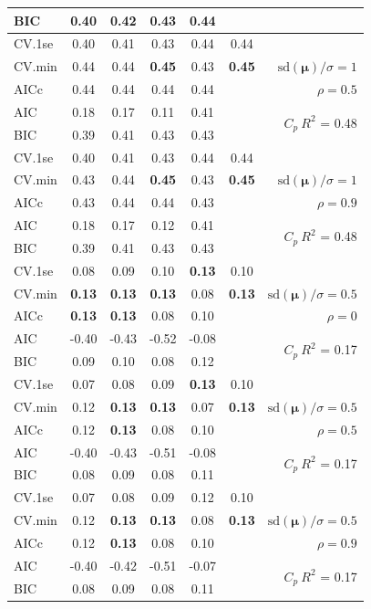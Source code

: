 \documentclass[12pt]{article}
\newcommand{\mr}[1]{\mathrm{#1}}
\newcommand{\bm}[1]{\mathbf{#1}}
\begin{document}
\begin{table}[p]
\begin{center}
\begin{tabular}{l*{5}{c}|r}
BIC & 0.40 & 0.42 & 0.43 & 0.44 & & \\
 \hline 
CV.1se & 0.40 & 0.41 & 0.43 & 0.44 & 0.44 &\\
CV.min & 0.44 & 0.44 & {\bf 0.45} & 0.43 & {\bf 0.45} &  $\mr{sd}(\bm{\mu})/\sigma=1$ \\
AICc & 0.44 & 0.44 & 0.44 & 0.44 & & $\rho=0.5$ \\
AIC & 0.18 & 0.17 & 0.11 & 0.41 & & \multirow{2}{*}{$C_p ~ R^2$ = 0.48} \\
BIC & 0.39 & 0.41 & 0.43 & 0.43 & & \\
 \hline 
CV.1se & 0.40 & 0.41 & 0.43 & 0.44 & 0.44 &\\
CV.min & 0.43 & 0.44 & {\bf 0.45} & 0.43 & {\bf 0.45} &  $\mr{sd}(\bm{\mu})/\sigma=1$ \\
AICc & 0.43 & 0.44 & 0.44 & 0.43 & & $\rho=0.9$ \\
AIC & 0.18 & 0.17 & 0.12 & 0.41 & & \multirow{2}{*}{$C_p ~ R^2$ = 0.48} \\
BIC & 0.39 & 0.41 & 0.43 & 0.43 & & \\
 \hline 
CV.1se & 0.08 & 0.09 & 0.10 & {\bf 0.13} & 0.10 &\\
CV.min & {\bf 0.13} & {\bf 0.13} & {\bf 0.13} & 0.08 & {\bf 0.13} &  $\mr{sd}(\bm{\mu})/\sigma=0.5$ \\
AICc & {\bf 0.13} & {\bf 0.13} & 0.08 & 0.10 & & $\rho=0$ \\
AIC & -0.40 & -0.43 & -0.52 & -0.08 & & \multirow{2}{*}{$C_p ~ R^2$ = 0.17} \\
BIC & 0.09 & 0.10 & 0.08 & 0.12 & & \\
 \hline 
CV.1se & 0.07 & 0.08 & 0.09 & {\bf 0.13} & 0.10 &\\
CV.min & 0.12 & {\bf 0.13} & {\bf 0.13} & 0.07 & {\bf 0.13} &  $\mr{sd}(\bm{\mu})/\sigma=0.5$ \\
AICc & 0.12 & {\bf 0.13} & 0.08 & 0.10 & & $\rho=0.5$ \\
AIC & -0.40 & -0.43 & -0.51 & -0.08 & & \multirow{2}{*}{$C_p ~ R^2$ = 0.17} \\
BIC & 0.08 & 0.09 & 0.08 & 0.11 & & \\
 \hline 
CV.1se & 0.07 & 0.08 & 0.09 & 0.12 & 0.10 &\\
CV.min & 0.12 & {\bf 0.13} & {\bf 0.13} & 0.08 & {\bf 0.13} &  $\mr{sd}(\bm{\mu})/\sigma=0.5$ \\
AICc & 0.12 & {\bf 0.13} & 0.08 & 0.10 & & $\rho=0.9$ \\
AIC & -0.40 & -0.42 & -0.51 & -0.07 & & \multirow{2}{*}{$C_p ~ R^2$ = 0.17} \\
BIC & 0.08 & 0.09 & 0.08 & 0.11 & & \\
 \hline 
\end{tabular}
\end{center}
\vspace{-1cm}
\end{table}
\end{document}
